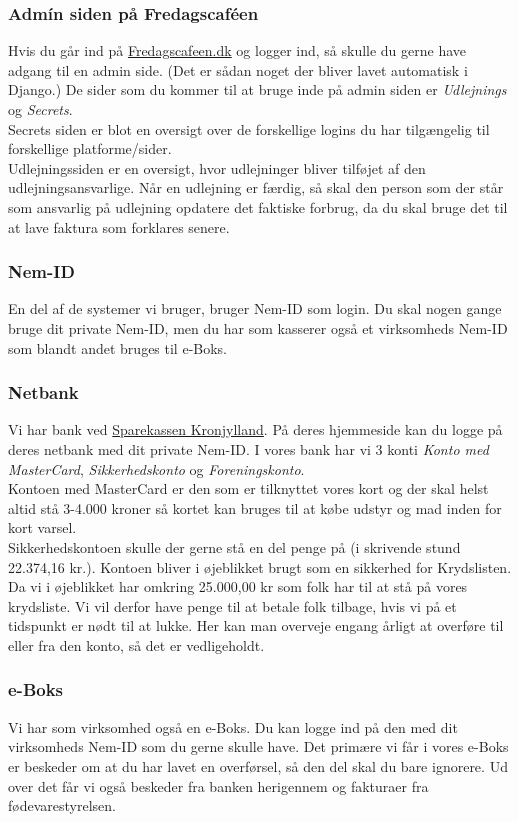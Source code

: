 \subsubsection{Admín siden på Fredagscaféen}
Hvis du går ind på \href{https://Fredagscafeen.dk}{Fredagscafeen.dk} og logger ind, så skulle du gerne have adgang til en admin side. (Det er sådan noget der bliver lavet automatisk i Django.) De sider som du kommer til at bruge inde på admin siden er \textit{Udlejnings} og \textit{Secrets}.\\
Secrets siden er blot en oversigt over de forskellige logins du har tilgængelig til forskellige platforme/sider.\\
Udlejningssiden er en oversigt, hvor udlejninger bliver tilføjet af den udlejningsansvarlige. Når en udlejning er færdig, så skal den person som der står som ansvarlig på udlejning opdatere det faktiske forbrug, da du skal bruge det til at lave faktura som forklares senere.
\subsubsection{Nem-ID}
En del af de systemer vi bruger, bruger Nem-ID som login. Du skal nogen gange bruge dit private Nem-ID, men du har som kasserer også et virksomheds Nem-ID som blandt andet bruges til e-Boks.
\subsubsection{Netbank}
Vi har bank ved \href{https://www.sparkron.dk/}{Sparekassen Kronjylland}. På deres hjemmeside kan du logge på deres netbank med dit private Nem-ID. I vores bank har vi 3 konti \textit{Konto med MasterCard}, \textit{Sikkerhedskonto} og \textit{Foreningskonto}.\\ Kontoen med MasterCard er den som er tilknyttet vores kort og der skal helst altid stå 3-4.000 kroner så kortet kan bruges til at købe udstyr og mad inden for kort varsel.\\
Sikkerhedskontoen skulle der gerne stå en del penge på (i skrivende stund 22.374,16 kr.). Kontoen bliver i øjeblikket brugt som en sikkerhed for Krydslisten. Da vi i øjeblikket har omkring 25.000,00 kr som folk har til at stå på vores krydsliste. Vi vil derfor have penge til at betale folk tilbage, hvis vi på et tidspunkt er nødt til at lukke. Her kan man overveje engang årligt at overføre til eller fra den konto, så det er vedligeholdt.\\
\subsubsection{e-Boks}
Vi har som virksomhed også en e-Boks. Du kan logge ind på den med dit virksomheds Nem-ID som du gerne skulle have. Det primære vi får i vores e-Boks er beskeder om at du har lavet en overførsel, så den del skal du bare ignorere. Ud over det får vi også beskeder fra banken herigennem og fakturaer fra fødevarestyrelsen.
